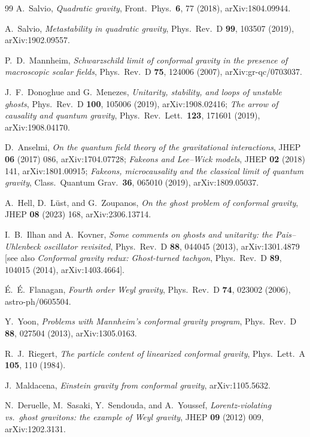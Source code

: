 \documentclass[11pt]{article}
\theoremstyle{definition}
\theoremstyle{remark}
\begin{document}
\begin{thebibliography}{99}
A.~Salvio,
\emph{Quadratic gravity},
Front.\ Phys.\ \textbf{6}, 77 (2018), arXiv:1804.09944.

A.~Salvio,
\emph{Metastability in quadratic gravity},
Phys.\ Rev.\ D \textbf{99}, 103507 (2019), arXiv:1902.09557.

P.~D.~Mannheim,
\emph{Schwarzschild limit of conformal gravity in the presence of
macroscopic scalar fields},
Phys.\ Rev.\ D \textbf{75}, 124006 (2007), arXiv:gr-qc/0703037.

J.~F.~Donoghue and G.~Menezes,
\emph{Unitarity, stability, and loops of unstable ghosts},
Phys.\ Rev.\ D \textbf{100}, 105006 (2019), arXiv:1908.02416;
\emph{The arrow of causality and quantum gravity},
Phys.\ Rev.\ Lett.\ \textbf{123}, 171601 (2019), arXiv:1908.04170.

D.~Anselmi,
\emph{On the quantum field theory of the gravitational
interactions},
JHEP \textbf{06} (2017) 086, arXiv:1704.07728;
\emph{Fakeons and Lee--Wick models},
JHEP \textbf{02} (2018) 141, arXiv:1801.00915;
\emph{Fakeons, microcausality and the classical limit of quantum
gravity},
Class.\ Quantum Grav.\ \textbf{36}, 065010 (2019), arXiv:1809.05037.

A.~Hell, D.~L\"ust, and G.~Zoupanos,
\emph{On the ghost problem of conformal gravity},
JHEP \textbf{08} (2023) 168, arXiv:2306.13714.

I.~B.~Ilhan and A.~Kovner,
\emph{Some comments on ghosts and unitarity: the Pais--Uhlenbeck
oscillator revisited},
Phys.\ Rev.\ D \textbf{88}, 044045 (2013), arXiv:1301.4879
[see also \emph{Conformal gravity redux: Ghost-turned tachyon},
Phys.\ Rev.\ D \textbf{89}, 104015 (2014), arXiv:1403.4664].

\'E.~\'E.~Flanagan,
\emph{Fourth order Weyl gravity},
Phys.\ Rev.\ D \textbf{74}, 023002 (2006), astro-ph/0605504.

Y.~Yoon,
\emph{Problems with Mannheim's conformal gravity program},
Phys.\ Rev.\ D \textbf{88}, 027504 (2013), arXiv:1305.0163.

R.~J.~Riegert,
\emph{The particle content of linearized conformal gravity},
Phys.\ Lett.\ A \textbf{105}, 110 (1984).

J.~Maldacena,
\emph{Einstein gravity from conformal gravity},
arXiv:1105.5632.

N.~Deruelle, M.~Sasaki, Y.~Sendouda, and A.~Youssef,
\emph{Lorentz-violating vs.\ ghost gravitons: the example of Weyl
gravity},
JHEP \textbf{09} (2012) 009, arXiv:1202.3131.


\end{thebibliography}
\end{document}
